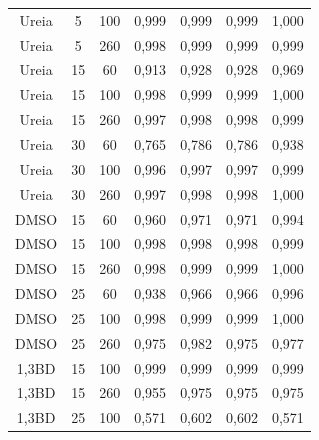 \begin{table}[h]
{\begin{tabular}{c c c | c c c c}
				  Ureia   & 5         & 100        & 0,999   & 0,999    & 0,999    & 1,000      \\
				  Ureia   & 5         & 260        & 0,998   & 0,999    & 0,999    & 0,999      \\
				  Ureia   & 15        & 60         & 0,913   & 0,928    & 0,928    & 0,969      \\
				  Ureia   & 15        & 100        & 0,998   & 0,999    & 0,999    & 1,000      \\
				  Ureia   & 15        & 260        & 0,997   & 0,998    & 0,998    & 0,999      \\
				  Ureia   & 30        & 60         & 0,765   & 0,786    & 0,786    & 0,938      \\
				  Ureia   & 30        & 100        & 0,996   & 0,997    & 0,997    & 0,999      \\
				  Ureia   & 30        & 260        & 0,997   & 0,998    & 0,998    & 1,000      \\ \midrule
				  DMSO    & 15        & 60         & 0,960   & 0,971    & 0,971    & 0,994      \\
				  DMSO    & 15        & 100        & 0,998   & 0,998    & 0,998    & 0,999      \\
				  DMSO    & 15        & 260        & 0,998   & 0,999    & 0,999    & 1,000      \\
				  DMSO    & 25        & 60         & 0,938   & 0,966    & 0,966    & 0,996      \\
				  DMSO    & 25        & 100        & 0,998   & 0,999    & 0,999    & 1,000      \\
				  DMSO    & 25        & 260        & 0,975   & 0,982    & 0,975    & 0,977      \\
				  1,3BD   & 15        & 100        & 0,999   & 0,999    & 0,999    & 0,999      \\
				  1,3BD   & 15        & 260        & 0,955   & 0,975    & 0,975    & 0,975      \\
				  1,3BD   & 25        & 100        & 0,571   & 0,602    & 0,602    & 0,571		\\ \bottomrule
			\end{tabular}
		}{}
	\end{table}  

